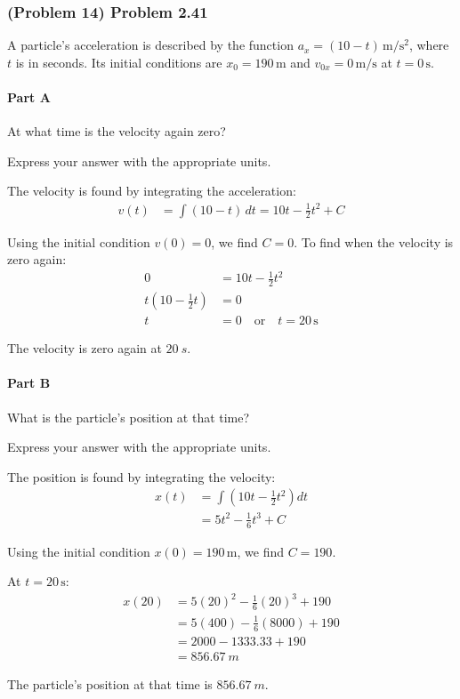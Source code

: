 \newpage

\subsubsection{(Problem 14) Problem 2.41}

A particle's acceleration is described by the function \( a_x = (10 - t) \, \mathrm{m/s^2} \), where \( t \) is in seconds. Its initial conditions are \( x_0 = 190 \, \mathrm{m} \) and \( v_{0x} = 0 \, \mathrm{m/s} \) at \( t = 0 \, \mathrm{s} \).

\paragraph{Part A}
At what time is the velocity again zero?

Express your answer with the appropriate units.

\begin{solution}
	The velocity is found by integrating the acceleration:
	\begin{align*}
		v(t) &= \int (10 - t) \, dt = 10t - \frac{1}{2} t^2 + C
	\end{align*}

	Using the initial condition \( v(0) = 0 \), we find \( C = 0 \). To find when the velocity is zero again:
	\begin{align*}
		0 &= 10t - \frac{1}{2} t^2 \\
		t \left(10 - \frac{1}{2} t \right) &= 0 \\
		t &= 0 \quad \text{or} \quad t = 20 \, \mathrm{s}
	\end{align*}

	The velocity is zero again at \( \boxed{\SI{20}{s}} \).
\end{solution}

\paragraph{Part B}
What is the particle's position at that time?

Express your answer with the appropriate units.

\begin{solution}
	The position is found by integrating the velocity:
	\begin{align*}
		x(t) &= \int \left(10t - \frac{1}{2} t^2 \right) dt \\
		&= 5t^2 - \frac{1}{6} t^3 + C
	\end{align*}

	Using the initial condition \( x(0) = 190 \, \mathrm{m} \), we find \( C = 190 \).

	At \( t = 20 \, \mathrm{s} \):
	\begin{align*}
		x(20) &= 5(20)^2 - \frac{1}{6} (20)^3 + 190 \\
		&= 5(400) - \frac{1}{6}(8000) + 190 \\
		&= 2000 - 1333.33 + 190 \\
		&= \SI{856.67}{m}
	\end{align*}

	The particle's position at that time is \( \boxed{\SI{856.67}{m}} \).
\end{solution}

